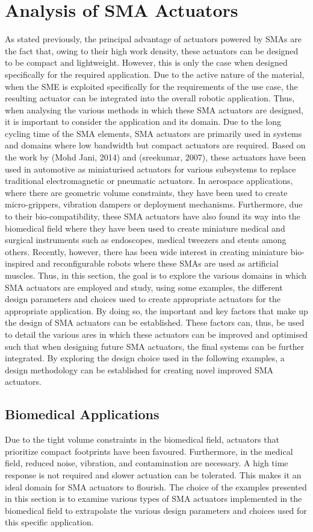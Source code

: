 \section{Analysis of SMA Actuators}
As stated previously, the principal advantage of actuators powered by SMAs are the fact that, owing to their high work density, these actuators can be designed to be compact and lightweight. However, this is only the case when designed specifically for the required application. Due to the active nature of the material, when the SME is exploited specifically for the requirements of the use case, the resulting actuator can be integrated into the overall robotic application. Thus, when analysing the various methods in which these SMA actuators are designed, it is important to consider the application and its domain. Due to the long cycling time of the SMA elements, SMA actuators are primarily used in systems and domains where low bandwidth but compact actuators are required. Based on the work by \todocite (Mohd Jani, 2014) and \todocite (sreekumar, 2007), these actuators have been used in automotive as miniaturised actuators for various subsystems to replace traditional electromagnetic or pneumatic actuators. In aerospace applications, where there are geometric volume constraints, they have been used to create micro-grippers, vibration dampers or deployment mechanisms. Furthermore, due to their bio-compatibility, these SMA actuators have also found its way into the biomedical field where they have been used to create miniature medical and surgical instruments such as endoscopes, medical tweezers and stents among others. Recently, however, there has been wide interest in creating miniature bio-inspired and reconfigurable robots where these SMAs are used as artificial muscles. Thus, in this section, the goal is to explore the various domains in which SMA actuators are employed and study, using some examples, the different design parameters and choices used to create appropriate actuators for the appropriate application. By doing so, the important and key factors that make up the design of SMA actuators can be established. These factors can, thus, be used to detail the various ares in which these actuators can be improved and optimised such that when designing future SMA actuators, the final systems can be further integrated. By exploring the design choice used in the following examples, a design methodology can be established for creating novel improved SMA actuators.

\subsection{Biomedical Applications}
Due to the tight volume constraints in the biomedical field, actuators that prioritize compact footprints have been favoured. Furthermore, in the medical field, reduced noise, vibration, and contamination are necessary. A high time response is not required and slower actuation can be tolerated. This makes it an ideal domain for SMA actuators to flourish. The choice of the examples presented in this section is to examine various types of SMA actuators implemented in the biomedical field to extrapolate the various design parameters and choices used for this specific application.

